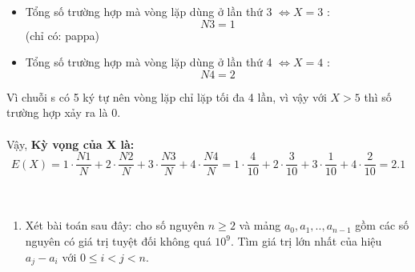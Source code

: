 \documentclass[12pt,a4paper]{article}
\begin{document}
\begin{enumerate}[label=\textbf{Câu 1.\arabic*} ]
\begin{itemize}[label=$\bullet$]
\begin{itemize}[label=$\circ$]
                    \end{itemize}
              \item Tổng số trường hợp mà vòng lặp dùng ở lần thứ 3 $ \Leftrightarrow X = 3$ : $$N3
                        = 1$$ (chỉ có: pappa)
              \item Tổng số trường hợp mà vòng lặp dùng ở lần thứ 4 $ \Leftrightarrow X = 4$ : $$N4
                        = 2$$
          \end{itemize}
          Vì chuỗi s có 5 ký tự nên vòng lặp chỉ lặp tối đa 4 lần, vì vậy với $X > 5$ thì số trường hợp xảy ra là 0.\\ \\
          Vậy, \textbf{Kỳ vọng của X là:}
          $$ E(X) = 1 \cdot \frac{N1}{N} + 2 \cdot \frac{N2}{N} + 3 \cdot \frac{N3}{N} + 4 \cdot \frac{N4}{N} = 1 \cdot \frac{4}{10} + 2 \cdot \frac{3}{10} + 3 \cdot \frac{1}{10} + 4 \cdot \frac{2}{10} = 2.1 $$\\ \\
    \end{enumerate}
    \begin{enumerate}[label=\textbf{Câu 2:} ]
    
    \item Xét bài toán sau đây: cho số nguyên $n \ge 2$ và mảng $a_0, a_1,.., a_{n-1}$
          gồm các số nguyên có giá trị tuyệt đối không quá $10^9$. Tìm giá trị lớn nhất
          của hiệu $a_j - a_i$ với $0 \le i < j < n$.
        \end{enumerate}
\end{document}
